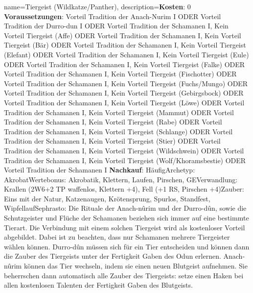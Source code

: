 {
    name={Tiergeist (Wildkatze/Panther)},
    description={\textbf{Kosten}: 0 \textbf{Voraussetzungen}: Vorteil Tradition der Anach-Nurim I ODER Vorteil Tradition der Durro-dun I ODER Vorteil Tradition der Schamanen I, Kein Vorteil Tiergeist (Affe) ODER Vorteil Tradition der Schamanen I, Kein Vorteil Tiergeist (Bär) ODER Vorteil Tradition der Schamanen I, Kein Vorteil Tiergeist (Elefant) ODER Vorteil Tradition der Schamanen I, Kein Vorteil Tiergeist (Eule) ODER Vorteil Tradition der Schamanen I, Kein Vorteil Tiergeist (Falke) ODER Vorteil Tradition der Schamanen I, Kein Vorteil Tiergeist (Fischotter) ODER Vorteil Tradition der Schamanen I, Kein Vorteil Tiergeist (Fuchs/Mungo) ODER Vorteil Tradition der Schamanen I, Kein Vorteil Tiergeist (Gebirgsbock) ODER Vorteil Tradition der Schamanen I, Kein Vorteil Tiergeist (Löwe) ODER Vorteil Tradition der Schamanen I, Kein Vorteil Tiergeist (Mammut) ODER Vorteil Tradition der Schamanen I, Kein Vorteil Tiergeist (Rabe) ODER Vorteil Tradition der Schamanen I, Kein Vorteil Tiergeist (Schlange) ODER Vorteil Tradition der Schamanen I, Kein Vorteil Tiergeist (Stier) ODER Vorteil Tradition der Schamanen I, Kein Vorteil Tiergeist (Wildschwein) ODER Vorteil Tradition der Schamanen I, Kein Vorteil Tiergeist (Wolf/Khoramsbestie) ODER Vorteil Tradition der Schamanen I \textbf{Nachkauf}: Häufig\newline Archetyp: Akrobat\newline Wertebonus: Akrobatik, Klettern, Laufen, Pirschen, GE\newline Verwandlung: Krallen (2W6+2 TP waffenlos, Klettern +4), Fell (+1 RS, Pirschen +4)\newline Zauber: Eins mit der Natur, Katzenaugen, Krötensprung, Spurlos, Standfest, Wipfellauf\newline Sephrasto: Die Rituale der Anach-nûrim und der Durro-dûn, sowie die Schutzgeister und Flüche der Schamanen beziehen sich immer auf eine bestimmte Tierart. Die Verbindung mit einem solchen Tiergeist wird als kostenloser Vorteil abgebildet. Dabei ist zu beachten, dass nur Schamanen mehrere Tiergeister wählen können. Durro-dûn müssen sich für ein Tier entscheiden und können dann die Zauber des Tiergeists unter der Fertigkeit Gaben des Odun erlernen. Anach-nûrim können das Tier wechseln, indem sie einen neuen Blutgeist aufnehmen. Sie beherrschen dann automatisch alle Zauber des Tiergeists: setze einen Haken bei allen kostenlosen Talenten der Fertigkeit Gaben des Blutgeists.}
}


